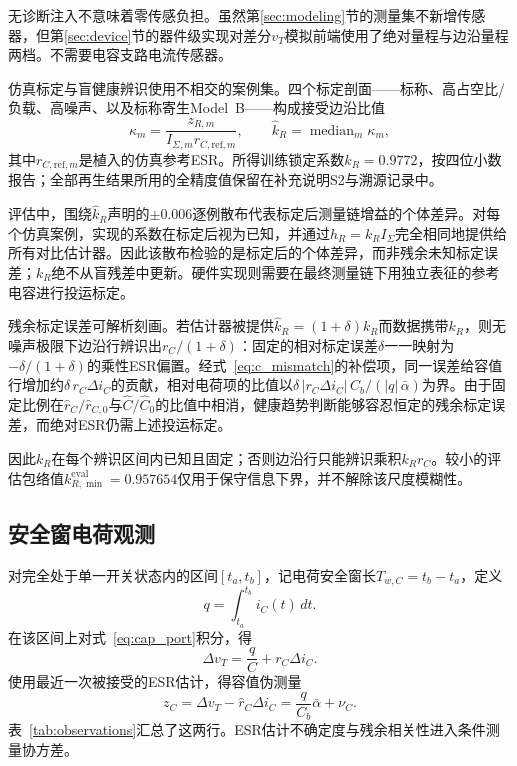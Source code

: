 \documentclass[zihao=5,a4paper]{ctexart}
\newcommand{\alphab}{\bar{\alpha}}
\begin{document}
无诊断注入不意味着零传感负担。虽然第\ref{sec:modeling}节的测量集不新增传感器，但第\ref{sec:device}节的器件级实现对差分$v_T$模拟前端使用了绝对量程与边沿量程两档。不需要电容支路电流传感器。

仿真标定与盲健康辨识使用不相交的案例集。四个标定剖面——标称、高占空比/负载、高噪声、以及标称寄生Model~B——构成接受边沿比值
\begin{equation}
\kappa_m=\frac{z_{R,m}}{I_{\Sigma,m}r_{C,\mathrm{ref},m}},
\qquad
\hat k_R=\operatorname{median}_m\kappa_m,
\label{eq:kr_calibration}
\end{equation}
其中$r_{C,\mathrm{ref},m}$是植入的仿真参考ESR。所得训练锁定系数$k_R=0.9772$，按四位小数报告；全部再生结果所用的全精度值保留在补充说明S2与溯源记录中。

评估中，围绕$\hat k_R$声明的$\pm0.006$逐例散布代表标定后测量链增益的个体差异。对每个仿真案例，实现的系数在标定后视为已知，并通过$h_R=k_RI_\Sigma$完全相同地提供给所有对比估计器。因此该散布检验的是标定后的个体差异，而非残余未知标定误差；$k_R$绝不从盲残差中更新。硬件实现则需要在最终测量链下用独立表征的参考电容进行投运标定。

残余标定误差可解析刻画。若估计器被提供$\hat k_R=(1+\delta)k_R$而数据携带$k_R$，则无噪声极限下边沿行辨识出$r_C/(1+\delta)$：固定的相对标定误差$\delta$一一映射为$-\delta/(1+\delta)$的乘性ESR偏置。经式~\eqref{eq:c_mismatch}的补偿项，同一误差给容值行增加约$\delta\,r_C\Delta i_C$的贡献，相对电荷项的比值以$\delta\,|r_C\Delta i_C|\,C_b/(|q|\,\alphab)$为界。由于固定比例在$\hat r_C/\hat r_{C,0}$与$\hat C/\hat C_0$的比值中相消，健康趋势判断能够容忍恒定的残余标定误差，而绝对ESR仍需上述投运标定。

因此$k_R$在每个辨识区间内已知且固定；否则边沿行只能辨识乘积$k_Rr_C$。较小的评估包络值$k_{R,\min}^{\mathrm{eval}}=0.957654$仅用于保守信息下界，并不解除该尺度模糊性。

\subsection{安全窗电荷观测}

对完全处于单一开关状态内的区间$[t_a,t_b]$，记电荷安全窗长$T_{w,C}=t_b-t_a$，定义
\begin{equation}
q=\int_{t_a}^{t_b}i_C(t)\,dt.
\label{eq:charge}
\end{equation}
在该区间上对式~\eqref{eq:cap_port}积分，得
\begin{equation}
\Delta v_T=\frac{q}{C}+r_C\Delta i_C.
\label{eq:integral_port}
\end{equation}
使用最近一次被接受的ESR估计，得容值伪测量
\begin{equation}
z_C=\Delta v_T-\hat r_C\Delta i_C
=\frac{q}{C_b}\alphab+\nu_C.
\label{eq:c_observation}
\end{equation}
表~\ref{tab:observations}汇总了这两行。ESR估计不确定度与残余相关性进入条件测量协方差。
\end{document}
